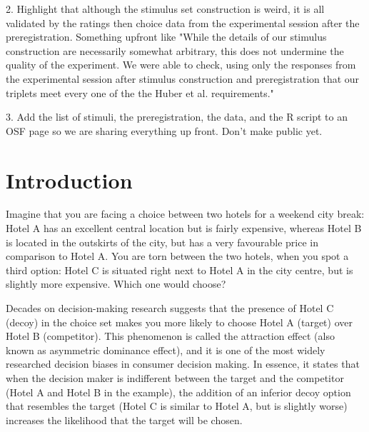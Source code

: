 \documentclass[12pt, a4paper]{article}
\begin{document}
2. Highlight that although the stimulus set construction is weird, it is all validated by the ratings then choice data from the experimental session after the preregistration. Something upfront like "While the details of our stimulus construction are necessarily somewhat arbitrary, this does not undermine the quality of the experiment. We were able to check, using only the responses from the experimental session after stimulus construction and preregistration that our triplets meet every one of the the Huber et al. requirements."

3. Add the list of stimuli, the preregistration, the data, and the R script to an OSF page so we are sharing everything up front. Don't make public yet.

\section{Introduction}

Imagine that you are facing a choice between two hotels for a weekend city break: Hotel A has an excellent central location but is fairly expensive, whereas Hotel B is located in the outskirts of the city, but has a very favourable price in comparison to Hotel A. You are torn between the two hotels, when you spot a third option: Hotel C is situated right next to Hotel A in the city centre, but is slightly more expensive. Which one would choose?

Decades on decision-making research suggests that the presence of Hotel C (decoy) in the choice set makes you more likely to choose Hotel A (target) over Hotel B (competitor). This phenomenon is called the attraction effect (also known as asymmetric dominance effect), and it is one of the most widely researched decision biases in consumer decision making. In essence, it states that when the decision maker is indifferent between the target and the competitor (Hotel A and Hotel B in the example), the addition of an inferior decoy option that resembles the target (Hotel C is similar to Hotel A, but is slightly worse) increases the likelihood that the target will be chosen.

\end{document}
